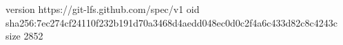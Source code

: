 version https://git-lfs.github.com/spec/v1
oid sha256:7ec274cf24110f232b191d70a3468d4aedd048ec0d0c2f4a6c433d82c8c4243c
size 2852

